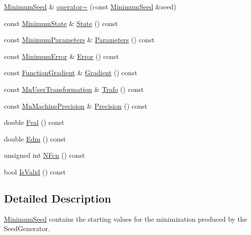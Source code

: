 \begin{DoxyCompactItemize}
\item 
\mbox{\hyperlink{classROOT_1_1Minuit2_1_1MinimumSeed}{Minimum\+Seed}} \& \mbox{\hyperlink{classROOT_1_1Minuit2_1_1MinimumSeed_a0ec0790834635093f5b3cffa976efe60}{operator=}} (const \mbox{\hyperlink{classROOT_1_1Minuit2_1_1MinimumSeed}{Minimum\+Seed}} \&seed)
\item 
const \mbox{\hyperlink{classROOT_1_1Minuit2_1_1MinimumState}{Minimum\+State}} \& \mbox{\hyperlink{classROOT_1_1Minuit2_1_1MinimumSeed_a732476aa579a27366511684213835a2e}{State}} () const
\item 
const \mbox{\hyperlink{classROOT_1_1Minuit2_1_1MinimumParameters}{Minimum\+Parameters}} \& \mbox{\hyperlink{classROOT_1_1Minuit2_1_1MinimumSeed_a994d60b61e96fefc68cbccab8f82794d}{Parameters}} () const
\item 
const \mbox{\hyperlink{classROOT_1_1Minuit2_1_1MinimumError}{Minimum\+Error}} \& \mbox{\hyperlink{classROOT_1_1Minuit2_1_1MinimumSeed_a19cc15c1feb45267a1a8b2cdb4f25ac2}{Error}} () const
\item 
const \mbox{\hyperlink{classROOT_1_1Minuit2_1_1FunctionGradient}{Function\+Gradient}} \& \mbox{\hyperlink{classROOT_1_1Minuit2_1_1MinimumSeed_acde7a067ded2fb87a3dba51ba82a1afd}{Gradient}} () const
\item 
const \mbox{\hyperlink{classROOT_1_1Minuit2_1_1MnUserTransformation}{Mn\+User\+Transformation}} \& \mbox{\hyperlink{classROOT_1_1Minuit2_1_1MinimumSeed_a140162d25593e6675f6f521fc9d5fc84}{Trafo}} () const
\item 
const \mbox{\hyperlink{classROOT_1_1Minuit2_1_1MnMachinePrecision}{Mn\+Machine\+Precision}} \& \mbox{\hyperlink{classROOT_1_1Minuit2_1_1MinimumSeed_a0cc83616e61f2d3552cedf34ed09e361}{Precision}} () const
\item 
double \mbox{\hyperlink{classROOT_1_1Minuit2_1_1MinimumSeed_a55c498b499c84f1a693729aa269db9aa}{Fval}} () const
\item 
double \mbox{\hyperlink{classROOT_1_1Minuit2_1_1MinimumSeed_ab378accd110c0313557d3e916e2a9282}{Edm}} () const
\item 
unsigned int \mbox{\hyperlink{classROOT_1_1Minuit2_1_1MinimumSeed_a095d402b58fea6b0b06323b079974bf3}{N\+Fcn}} () const
\item 
bool \mbox{\hyperlink{classROOT_1_1Minuit2_1_1MinimumSeed_a5d9ffd4dbd68f6cfcfef821844e70158}{Is\+Valid}} () const
\end{DoxyCompactItemize}


\subsection{Detailed Description}
\mbox{\hyperlink{classROOT_1_1Minuit2_1_1MinimumSeed}{Minimum\+Seed}} contains the starting values for the minimization produced by the Seed\+Generator. 

